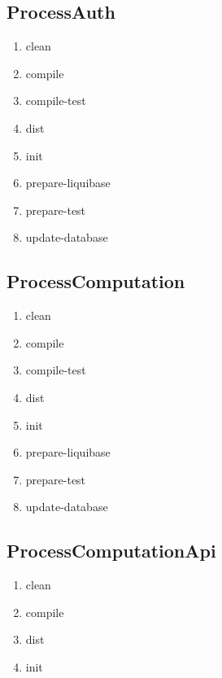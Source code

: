 \documentclass{article}
\begin{document}
\subsection{ProcessAuth}
{\small
\begin{enumerate}
  \item clean
  \item compile
  \item compile-test
  \item dist
  \item init
  \item prepare-liquibase
  \item prepare-test
  \item update-database
\end{enumerate}
}
\subsection{ProcessComputation}
{\small
\begin{enumerate}
  \item clean
  \item compile
  \item compile-test
  \item dist
  \item init
  \item prepare-liquibase
  \item prepare-test
  \item update-database
\end{enumerate}
}
\subsection{ProcessComputationApi}
{\small
\begin{enumerate}
  \item clean
  \item compile
  \item dist
  \item init
\end{enumerate}
}
\end{document}
